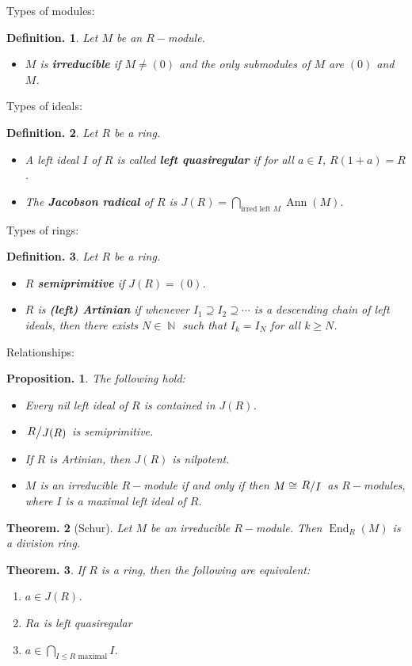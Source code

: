 \documentclass[11pt, a4paper]{memoir}
\DeclareMathOperator{\N}{{\mathbb{N}}}
\theoremstyle{change}
\newtheorem{theorem}{Theorem.}[section]
\newtheorem{proposition}[theorem]{Proposition.}
\theoremstyle{plain}
\theoremstyle{nonumberplain}
\newtheorem{definition}{Definition.}
\DeclareMathOperator{\Ann}{Ann}
\DeclareMathOperator{\End}{End}
\newcommand{\quot}[2]{\mathchoice{\left.\raisebox{0.14em}{$#1$}\middle/\raisebox{-0.14em}{$#2$}\right.}
                                 {\left.\raisebox{0.08em}{$#1$}\middle/\raisebox{-0.08em}{$#2$}\right.}
                                 {\left.\raisebox{0.03em}{$#1$}\middle/\raisebox{-0.03em}{$#2$}\right.}
                                 {\left.\raisebox{0em}{$#1$}\middle/\raisebox{0em}{$#2$}\right.}}
\numberwithin{equation}{section}
\begin{document}
Types of modules:
\begin{definition}
    Let $M$ be an $R-$module.
    \begin{itemize}[nl]
        \item $M$ is \textbf{irreducible} if $M\neq (0)$ and the only submodules of $M$ are $(0)$ and $M$.
    \end{itemize}
\end{definition}
Types of ideals:
\begin{definition}
    Let $R$ be a ring.
    \begin{itemize}[nl]
        \item A left ideal $I$ of $R$ is called \textbf{left quasiregular} if for all $a\in I$, $R(1+a)=R$.
        \item The \textbf{Jacobson radical} of $R$ is $J(R)=\bigcap_{\text{irred left }M}\Ann(M)$.
    \end{itemize}
\end{definition}
Types of rings:
\begin{definition}
    Let $R$ be a ring.
    \begin{itemize}[nl]
        \item $R$ \textbf{semiprimitive} if $J(R)=(0)$.
        \item $R$ is \textbf{(left) Artinian} if whenever $I_1\supseteq I_2\supseteq\cdots$ is a descending chain of left ideals, then there exists $N\in\N$ such that $I_k=I_N$ for all $k\geq N$.
    \end{itemize}
\end{definition}
Relationships:
\begin{proposition}
    The following hold:
    \begin{itemize}[nl]
        \item Every nil left ideal of $R$ is contained in $J(R)$.
        \item $\quot{R}{J(R)}$ is semiprimitive.
        \item If $R$ is Artinian, then $J(R)$ is nilpotent.
        \item $M$ is an irreducible $R-$module if and only if then $M\cong \quot{R}{I}$ as $R-$modules, where $I$ is a maximal left ideal of $R$.
    \end{itemize}
\end{proposition}
\begin{theorem}[Schur]
    Let $M$ be an irreducible $R-$module.
    Then $\End_R(M)$ is a division ring.
\end{theorem}
\begin{theorem}
    If $R$ is a ring, then the following are equivalent:
    \begin{enumerate}[nl,r]
        \item $a\in J(R)$.
        \item $Ra$ is left quasiregular
        \item $a\in\bigcap_{I\leq R\text{ maximal}}I$.
    \end{enumerate}
\end{theorem}
\end{document}
